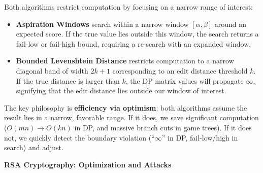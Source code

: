 \documentclass[12pt,addpoints]{exam}
\begin{document}
\begin{questions}
\begin{parts}
\begin{solution}
Both algorithms restrict computation by focusing on a narrow range of interest:
\begin{itemize}
    \item \textbf{Aspiration Windows} search within a narrow window $[\alpha, \beta]$ around an expected score. If the true value lies outside this window, the search returns a fail-low or fail-high bound, requiring a re-search with an expanded window.
    \item \textbf{Bounded Levenshtein Distance} restricts computation to a narrow diagonal band of width $2k+1$ corresponding to an edit distance threshold $k$. If the true distance is larger than $k$, the DP matrix values will propagate $\infty$, signifying that the edit distance lies outside our window of interest.
\end{itemize}
The key philosophy is \textbf{efficiency via optimism}: both algorithms assume the result lies in a narrow, favorable range. If it does, we save significant computation ($O(mn) \to O(kn)$ in DP, and massive branch cuts in game trees). If it does not, we quickly detect the boundary violation (``$\infty$'' in DP, fail-low/high in search) and adjust.
\end{solution}
\end{parts}

\question[20] \textbf{RSA Cryptography: Optimization and Attacks}

\end{questions}
\end{document}
